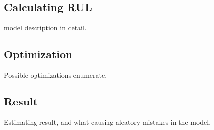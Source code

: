 	\subsection{Calculating RUL}
model description in detail.
	\subsection{Optimization}
Possible optimizations enumerate.
	\subsection{Result}
Estimating result, and what causing aleatory mistakes in the model. 